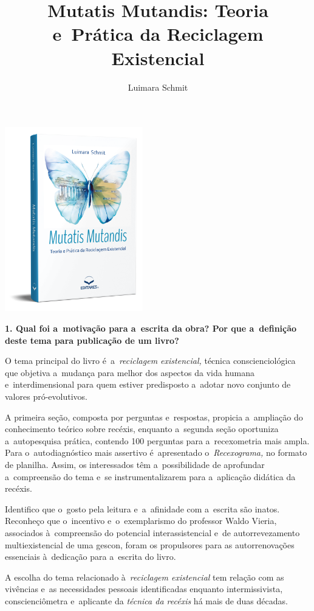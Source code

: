 \documentclass{gescons}
\author{Luimara Schmit}
\title{Mutatis Mutandis: Teoria e~Prática da Reciclagem Existencial}
\begin{document}
    \makeentrevistatitle

    \begin{multicols}{2}

\begin{center}
    \includegraphics[width=6cm]{articles/entrevista/mockups/Luimara}
\end{center}

\textbf{1. Qual foi a~motivação para a~escrita da obra? Por que a~definição deste tema para publicação de um livro?}


O tema principal do livro é~a~\emph{reciclagem existencial,} técnica conscienciológica que objetiva a~mudança para melhor dos aspectos da vida humana e~interdimensional para quem estiver predisposto a~adotar novo conjunto de valores pró-evolutivos.

A primeira seção, composta por perguntas e~respostas, propicia a~ampliação do conhecimento teórico sobre recéxis, enquanto a~segunda seção oportuniza a~autopesquisa prática, contendo 100 perguntas para a~recexometria mais ampla. Para o~autodiagnóstico mais assertivo é~apresentado o~\emph{Recexograma,} no formato de planilha. Assim, os interessados têm a~possibilidade de aprofundar a~compreensão do tema e~se instrumentalizarem para a~aplicação didática da recéxis.

Identifico que o~gosto pela leitura e~a~afinidade com a~escrita são inatos. Reconheço que o~incentivo e~o~exemplarismo do professor Waldo Vieria, associados à~compreensão do potencial interassistencial e~de autorrevezamento multiexistencial de uma gescon, foram os propulsores para as autorrenovações essenciais à~dedicação para a~escrita do livro.

A escolha do tema relacionado à~\emph{reciclagem existencial} tem relação com as vivências e~as necessidades pessoais identificadas enquanto intermissivista, conscienciômetra e~aplicante da \emph{técnica da recéxis} há mais de duas décadas.


\end{multicols}
\end{document}
